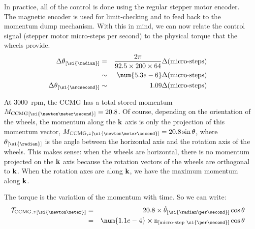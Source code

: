 In practice, all of the control is done using the regular stepper motor encoder. The magnetic encoder is used for limit-checking and to feed back to the momentum dump mechanism. With this in mind, we can now relate the control signal (stepper motor micro-steps per second) to the physical torque that the wheels provide. 
\begin{eqnarray}
\Delta\theta\units{\si{\radian}} &= &\frac{2\pi}{92.5\times 200\times 64}\Delta(\textrm{micro-steps}) \\ 
& \sim & \num{5.3e-6} \Delta(\textrm{micro-steps})\\
\Delta\theta\units{\si{\arcsecond}} &\sim &  1.09 \Delta(\textrm{micro-steps})
\end{eqnarray}

At 3000~rpm, the CCMG has a total stored momentum $\MCCMG\units{\si{\newton\meter\second}} = 20.8$. Of course, depending on the orientation of the wheels, the momentum along the $\textrm{\textbf{k}}$ axis is only the projection of this momentum vector, $\MCCMGz\units{\si{\newton\meter\second}} = 20.8\sin\theta$, where $\theta\units{\si{\radian}}$ is the angle between the horizontal axis and the rotation axis of the wheels. This makes sense: when the wheels are horizontal, there is no momentum projected on the $\textrm{\textbf{k}}$ axis because the rotation vectors of the wheels are orthogonal to $\textrm{\textbf{k}}$. When the rotation axes are along $\textrm{\textbf{k}}$, we have the maximum momentum along $\textrm{\textbf{k}}$. 

The torque is the variation of the momentum with time. So we can write:
\begin{eqnarray}
\ccmgtorque\units{\si{\newton\meter}} &= & 20.8\times \dot{\theta}\units{\si{\radian\per\second}} \cos\theta\\
 &= & \num{1.1e-4}\times \velstepper\units{micro-step~\si{\per\second}}\cos\theta
\end{eqnarray}

\begin{figure}[!ht]
	\centering
	
	\caption{}
	\label{fig:CCMGnocase}
    \end{figure}


